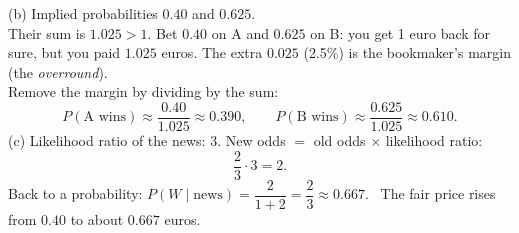 \begin{slides}
	\small
	(b) Implied probabilities $0.40$ and $0.625$.\\[1mm]
	\pause
	Their sum is $1.025>1$. Bet $0.40$ on A and $0.625$ on B: you get 1 euro
	back for sure, but you paid $1.025$ euros. The extra $0.025$ (2.5\%) is
	the bookmaker's margin (the \emph{overround}).\\[1mm]
	\pause
	Remove the margin by dividing by the sum:
	\[ P(\text{A wins})\approx\frac{0.40}{1.025}\approx 0.390,\qquad
		P(\text{B wins})\approx\frac{0.625}{1.025}\approx 0.610. \]
	\pause
	(c) Likelihood ratio of the news: $3$. New odds $=$ old odds $\times$
	likelihood ratio:
	\[ \frac23\cdot 3=2. \]
	\pause
	Back to a probability:
	$P(W\mid\text{news})=\dfrac{2}{1+2}=\dfrac23\approx 0.667$. \ The fair
	price rises from $0.40$ to about $0.667$ euros.
\end{slides}

